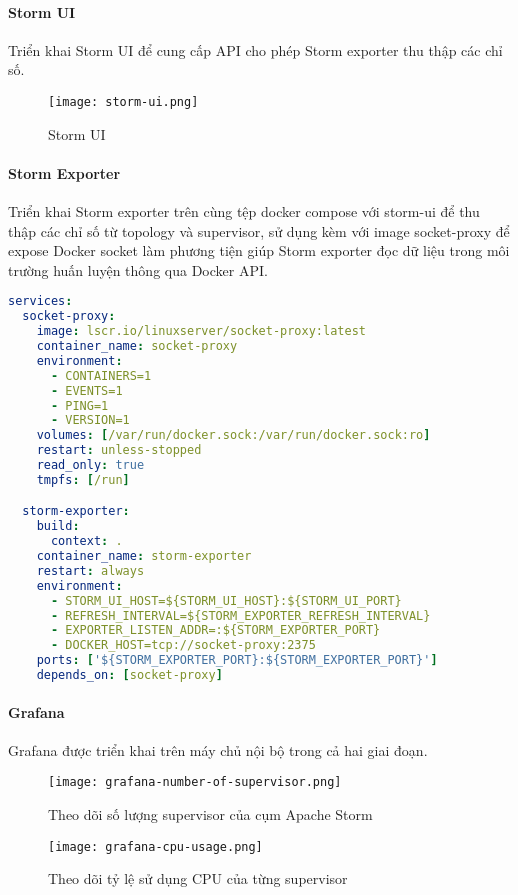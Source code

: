 \paragraph{Storm UI}

Triển khai Storm UI để cung cấp API cho phép Storm exporter thu thập các chỉ số.

\begin{figure}[H]
    \centering
    \texttt{[image: storm-ui.png]}
    \caption{Storm UI}
\end{figure}

\paragraph{Storm Exporter}

Triển khai Storm exporter trên cùng tệp docker compose với storm-ui để thu thập các chỉ số từ topology và supervisor, sử dụng kèm với image socket-proxy \autocite{linuxserver_socket-proxy} để expose Docker socket làm phương tiện giúp Storm exporter đọc dữ liệu trong môi trường huấn luyện thông qua Docker API.

\begin{lstlisting}[language=yaml, caption={Cấu hình triển khai Storm exporter}]
services:
  socket-proxy:
    image: lscr.io/linuxserver/socket-proxy:latest
    container_name: socket-proxy
    environment:
      - CONTAINERS=1
      - EVENTS=1
      - PING=1
      - VERSION=1
    volumes: [/var/run/docker.sock:/var/run/docker.sock:ro]
    restart: unless-stopped
    read_only: true
    tmpfs: [/run]

  storm-exporter:
    build:
      context: .
    container_name: storm-exporter
    restart: always
    environment:
      - STORM_UI_HOST=${STORM_UI_HOST}:${STORM_UI_PORT}
      - REFRESH_INTERVAL=${STORM_EXPORTER_REFRESH_INTERVAL}
      - EXPORTER_LISTEN_ADDR=:${STORM_EXPORTER_PORT}
      - DOCKER_HOST=tcp://socket-proxy:2375
    ports: ['${STORM_EXPORTER_PORT}:${STORM_EXPORTER_PORT}']
    depends_on: [socket-proxy]
\end{lstlisting}

\paragraph{Grafana}
Grafana được triển khai trên máy chủ nội bộ trong cả hai giai đoạn.

\begin{center}
    \begin{figure}[H]
        \texttt{[image: grafana-number-of-supervisor.png]}
        \caption{Theo dõi số lượng supervisor của cụm Apache Storm}
    \end{figure}

    \begin{figure}[H]
        \texttt{[image: grafana-cpu-usage.png]}
        \caption{Theo dõi tỷ lệ sử dụng CPU của từng supervisor}
    \end{figure}
\end{center}

